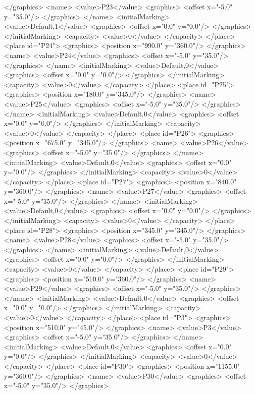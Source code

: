 </graphics>
<name>
<value>P23</value>
<graphics>
<offset x="-5.0" y="35.0"/>
</graphics>
</name>
<initialMarking>
<value>Default,1</value>
<graphics>
<offset x="0.0" y="0.0"/>
</graphics>
</initialMarking>
<capacity>
<value>0</value>
</capacity>
</place>
<place id="P24">
<graphics>
<position x="990.0" y="360.0"/>
</graphics>
<name>
<value>P24</value>
<graphics>
<offset x="-5.0" y="35.0"/>
</graphics>
</name>
<initialMarking>
<value>Default,0</value>
<graphics>
<offset x="0.0" y="0.0"/>
</graphics>
</initialMarking>
<capacity>
<value>0</value>
</capacity>
</place>
<place id="P25">
<graphics>
<position x="180.0" y="345.0"/>
</graphics>
<name>
<value>P25</value>
<graphics>
<offset x="-5.0" y="35.0"/>
</graphics>
</name>
<initialMarking>
<value>Default,0</value>
<graphics>
<offset x="0.0" y="0.0"/>
</graphics>
</initialMarking>
<capacity>
<value>0</value>
</capacity>
</place>
<place id="P26">
<graphics>
<position x="675.0" y="345.0"/>
</graphics>
<name>
<value>P26</value>
<graphics>
<offset x="-5.0" y="35.0"/>
</graphics>
</name>
<initialMarking>
<value>Default,0</value>
<graphics>
<offset x="0.0" y="0.0"/>
</graphics>
</initialMarking>
<capacity>
<value>0</value>
</capacity>
</place>
<place id="P27">
<graphics>
<position x="840.0" y="360.0"/>
</graphics>
<name>
<value>P27</value>
<graphics>
<offset x="-5.0" y="35.0"/>
</graphics>
</name>
<initialMarking>
<value>Default,0</value>
<graphics>
<offset x="0.0" y="0.0"/>
</graphics>
</initialMarking>
<capacity>
<value>0</value>
</capacity>
</place>
<place id="P28">
<graphics>
<position x="345.0" y="345.0"/>
</graphics>
<name>
<value>P28</value>
<graphics>
<offset x="-5.0" y="35.0"/>
</graphics>
</name>
<initialMarking>
<value>Default,0</value>
<graphics>
<offset x="0.0" y="0.0"/>
</graphics>
</initialMarking>
<capacity>
<value>0</value>
</capacity>
</place>
<place id="P29">
<graphics>
<position x="510.0" y="360.0"/>
</graphics>
<name>
<value>P29</value>
<graphics>
<offset x="-5.0" y="35.0"/>
</graphics>
</name>
<initialMarking>
<value>Default,0</value>
<graphics>
<offset x="0.0" y="0.0"/>
</graphics>
</initialMarking>
<capacity>
<value>0</value>
</capacity>
</place>
<place id="P3">
<graphics>
<position x="510.0" y="45.0"/>
</graphics>
<name>
<value>P3</value>
<graphics>
<offset x="-5.0" y="35.0"/>
</graphics>
</name>
<initialMarking>
<value>Default,0</value>
<graphics>
<offset x="0.0" y="0.0"/>
</graphics>
</initialMarking>
<capacity>
<value>0</value>
</capacity>
</place>
<place id="P30">
<graphics>
<position x="1155.0" y="360.0"/>
</graphics>
<name>
<value>P30</value>
<graphics>
<offset x="-5.0" y="35.0"/>
</graphics>
